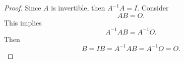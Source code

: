 \begin{Exercise}
	\begin{proof}
		Since $A$ is invertible, then $A^{-1} A = I$. Consider
		$$
		AB = O.
		$$
		This implies
		$$
		A^{-1} A B = A^{-1} O.
		$$
		Then
		$$
		B = I B = A^{-1} A B = A^{-1} O = O.
		$$
	\end{proof}
\end{Exercise}